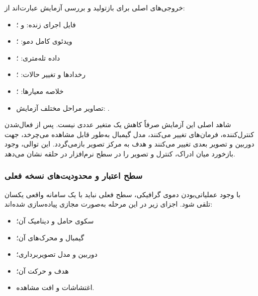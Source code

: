 \documentclass[12pt,a4paper]{article}
\begin{document}
خروجی‌های اصلی برای بازتولید و بررسی آزمایش عبارت‌اند از:

\begin{itemize}
	\item
	فایل اجرای زنده:
	و
	؛
	
	\item
	ویدئوی کامل دمو:
	؛
	
	\item
	داده تله‌متری:
	؛
	
	\item
	رخدادها و تغییر حالات:
	؛
	
	\item
	خلاصه معیارها:
	؛
	
	\item
	تصاویر مراحل مختلف آزمایش:
	.
\end{itemize}

\begin{keybox}
	شاهد اصلی این آزمایش صرفاً کاهش یک متغیر عددی نیست. پس از فعال‌شدن
	کنترل‌کننده، فرمان‌های  تغییر می‌کنند، مدل گیمبال
	به‌طور قابل مشاهده می‌چرخد، جهت دوربین و تصویر بعدی تغییر می‌کنند
	و هدف به مرکز تصویر بازمی‌گردد. این توالی، وجود بازخورد میان ادراک،
	کنترل و تصویر را در سطح نرم‌افزار در حلقه نشان می‌دهد.
\end{keybox}

\subsubsection{سطح اعتبار و محدودیت‌های نسخه فعلی}
\label{subsubsec:demo_current_limitations}

با وجود عملیاتی‌بودن دموی گرافیکی، سطح فعلی نباید با یک سامانه
واقعی یکسان تلقی شود. اجزای زیر در این مرحله به‌صورت مجازی
پیاده‌سازی شده‌اند:

\begin{itemize}
	\item سکوی حامل و دینامیک آن؛
	\item گیمبال و محرک‌های آن؛
	\item دوربین و مدل تصویربرداری؛
	\item هدف و حرکت آن؛
	\item اغتشاشات و افت مشاهده.
\end{itemize}
\end{document}
